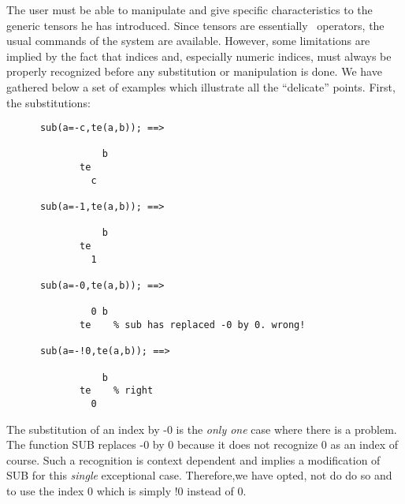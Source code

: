 
The user must be able to manipulate and give specific characteristics
to the generic tensors he has introduced.  Since tensors are essentially
\REDUCE\  operators, the usual commands of the system are
available.
However, some limitations are implied by the fact that indices and,
especially numeric indices, must always be properly recognized before
any substitution or manipulation is done. We have gathered below a set of
examples which illustrate all the ``delicate'' points.
First, the substitutions:
\begin{verbatim}
      sub(a=-c,te(a,b)); ==>

                 b
             te
               c

      sub(a=-1,te(a,b)); ==>

                 b
             te
               1

      sub(a=-0,te(a,b)); ==>

               0 b
             te    % sub has replaced -0 by 0. wrong!

      sub(a=-!0,te(a,b)); ==>

                 b
             te    % right
               0
\end{verbatim}
The substitution of an index  by -0 is the \emph{only one} case where
there is a problem. The function SUB replaces -0 by 0 because it does
not  recognize 0 as an index of course. Such a recognition is
context dependent and implies a modification of SUB
for this \emph{single} exceptional case. Therefore,we have opted, not do do so
and to use the index 0 which is simply !0 instead of 0.

